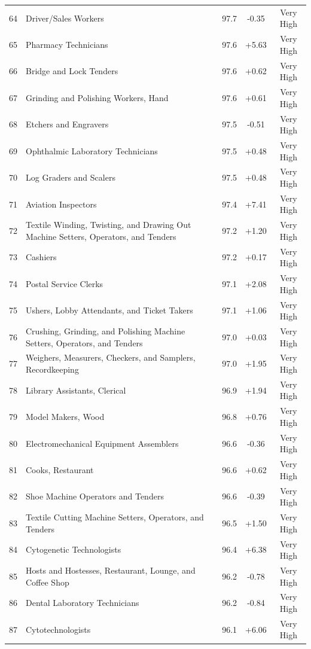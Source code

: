 {\begin{longtable}{rp{7cm}ccc}
64 & Driver/Sales Workers & 97.7 & -0.35 & Very High \\
65 & Pharmacy Technicians & 97.6 & +5.63 & Very High \\
66 & Bridge and Lock Tenders & 97.6 & +0.62 & Very High \\
67 & Grinding and Polishing Workers, Hand & 97.6 & +0.61 & Very High \\
68 & Etchers and Engravers & 97.5 & -0.51 & Very High \\
69 & Ophthalmic Laboratory Technicians & 97.5 & +0.48 & Very High \\
70 & Log Graders and Scalers & 97.5 & +0.48 & Very High \\
71 & Aviation Inspectors & 97.4 & +7.41 & Very High \\
72 & Textile Winding, Twisting, and Drawing Out Machine Setters, Operators, and Tenders & 97.2 & +1.20 & Very High \\
73 & Cashiers & 97.2 & +0.17 & Very High \\
74 & Postal Service Clerks & 97.1 & +2.08 & Very High \\
75 & Ushers, Lobby Attendants, and Ticket Takers & 97.1 & +1.06 & Very High \\
76 & Crushing, Grinding, and Polishing Machine Setters, Operators, and Tenders & 97.0 & +0.03 & Very High \\
77 & Weighers, Measurers, Checkers, and Samplers, Recordkeeping & 97.0 & +1.95 & Very High \\
78 & Library Assistants, Clerical & 96.9 & +1.94 & Very High \\
79 & Model Makers, Wood & 96.8 & +0.76 & Very High \\
80 & Electromechanical Equipment Assemblers & 96.6 & -0.36 & Very High \\
81 & Cooks, Restaurant & 96.6 & +0.62 & Very High \\
82 & Shoe Machine Operators and Tenders & 96.6 & -0.39 & Very High \\
83 & Textile Cutting Machine Setters, Operators, and Tenders & 96.5 & +1.50 & Very High \\
84 & Cytogenetic Technologists & 96.4 & +6.38 & Very High \\
85 & Hosts and Hostesses, Restaurant, Lounge, and Coffee Shop & 96.2 & -0.78 & Very High \\
86 & Dental Laboratory Technicians & 96.2 & -0.84 & Very High \\
87 & Cytotechnologists & 96.1 & +6.06 & Very High \\

\end{longtable}}

